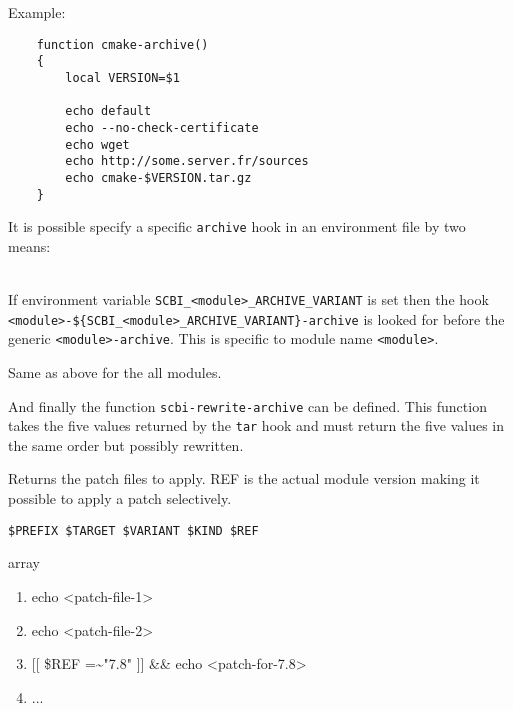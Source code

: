 \documentclass[a4paper,12pt,twoside]{article}
\newcommand{\code}[1]{\texttt{#1}}
\begin{document}
\begin{description}[font=\large\texttt]
	Example:
	\begin{lstlisting}
	function cmake-archive()
	{
		local VERSION=$1

		echo default
		echo --no-check-certificate
		echo wget
		echo http://some.server.fr/sources
		echo cmake-$VERSION.tar.gz
	}
	\end{lstlisting}

	It is possible specify a specific \code{archive} hook in an environment file by two means:

	\begin{description}[style=standard]
		\item[\code{SCBI\_<module>\_ARCHIVE\_VARIANT}] \hfill \\
		If environment variable \code{SCBI\_<module>\_ARCHIVE\_VARIANT} is set then the hook \\ \code{<module>-\$\{SCBI\_<module>\_ARCHIVE\_VARIANT\}-archive} is looked for before the generic \code{<module>-archive}. This is specific to module name \code{<module>}.

		\item[\code{SCBI\_ARCHIVE\_VARIANT}] Same as above for the all modules.
	\end{description}

	And finally the function \code{scbi-rewrite-archive} can be defined. This function takes the five values returned by the \code{tar} hook and must return the five values in the same order but possibly rewritten.

	\item[<module>{[}-common|<variant>{]}-patches] Returns the patch files to apply. REF is the actual module version making it possible to apply a patch selectively.

	\begin{description}[font=\textit,style=standard]
		\item[parameter] \tabto{2cm} \code{\$PREFIX \$TARGET \$VARIANT \$KIND \$REF}
		\item[return] \tabto{2cm} array
		\begin{enumerate}
			\item echo <patch-file-1>
			\item echo <patch-file-2>
			\item {[}{[} \$REF =\textasciitilde "7.8" {]}{]} \&\& echo <patch-for-7.8>
			\item ...
		\end{enumerate}
	\end{description}


\end{description}
\end{document}
